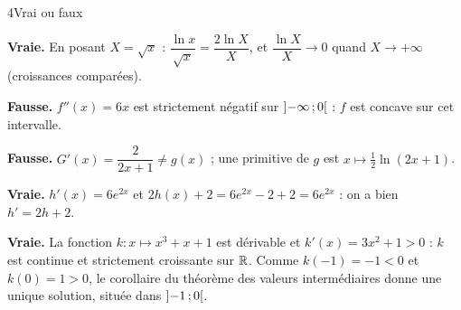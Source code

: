 

\begin{corrigeBac}{4}{Vrai ou faux}
\begin{questions}
  \item \textbf{Vraie.} En posant $X=\sqrt x$ : $\dfrac{\ln x}{\sqrt x}=\dfrac{2\ln X}{X}$, et $\dfrac{\ln X}{X}\to0$ quand $X\to+\infty$
    (croissances comparées). \pts{1 pt}
  \item \textbf{Fausse.} $f''(x)=6x$ est strictement négatif sur $\mathopen{]}-\infty\,{;}\,0\mathclose{[}$ : $f$ est concave sur cet intervalle. 
  \item \textbf{Fausse.} $G'(x)=\dfrac{2}{2x+1}\neq g(x)$ ; une primitive de $g$ est $x\mapsto\frac12\ln(2x+1)$. 
  \item \textbf{Vraie.} $h'(x)=6e^{2x}$ et $2h(x)+2=6e^{2x}-2+2=6e^{2x}$ : on a bien $h'=2h+2$. 
  \item \textbf{Vraie.} La fonction $k:x\mapsto x^{3}+x+1$ est dérivable et $k'(x)=3x^{2}+1>0$ : $k$ est continue et strictement
    croissante sur $\mathbb{R}$. Comme $k(-1)=-1<0$ et $k(0)=1>0$, le corollaire du théorème des valeurs intermédiaires donne une unique solution,
    située dans $\mathopen{]}-1\,{;}\,0\mathclose{[}$. 
\end{questions}
\end{corrigeBac}

